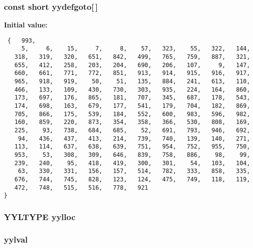 \subsubsection{\setlength{\rightskip}{0pt plus 5cm}const short yydefgoto[$\,$]\hspace{0.3cm}{\tt  [static]}}\label{parser_8c_a195}


{\bf Initial value:}

\footnotesize\begin{verbatim} {   993,
     5,     6,    15,     7,     8,    57,   323,    55,   322,   144,
   318,   319,   320,   651,   842,   499,   765,   759,   887,   321,
   655,   412,   258,   203,   204,   690,   206,   107,     9,   147,
   660,   661,   771,   772,   851,   913,   914,   915,   916,   917,
   965,   918,   919,    50,    51,   135,   884,   241,   613,   110,
   466,   133,   109,   430,   730,   303,   935,   224,   164,   860,
   173,   697,   176,   865,   181,   707,   345,   687,   178,   543,
   174,   698,   163,   679,   177,   541,   179,   704,   182,   869,
   705,   866,   175,   539,   184,   552,   600,   983,   596,   982,
   160,   859,   220,   873,   354,   358,   366,   530,   808,   169,
   225,    93,   738,   684,   685,    52,   691,   793,   946,   692,
    94,   436,   437,   413,   214,   739,   740,   139,   140,   271,
   113,   114,   637,   638,   639,   751,   954,   752,   955,   750,
   953,    53,   308,   309,   646,   839,   758,   886,    98,    99,
   239,   240,    95,   418,   419,   300,   301,    54,   103,   104,
    63,   330,   331,   156,   157,   514,   782,   333,   858,   335,
   676,   744,   745,   828,   123,   124,   475,   749,   118,   119,
   472,   748,   515,   516,   778,   921
}\end{verbatim}\normalsize 
{}
\subsubsection{\setlength{\rightskip}{0pt plus 5cm}YYLTYPE yylloc}\label{parser_8c_a202}


\subsubsection{ yylval}\label{parser_8c_a201}


